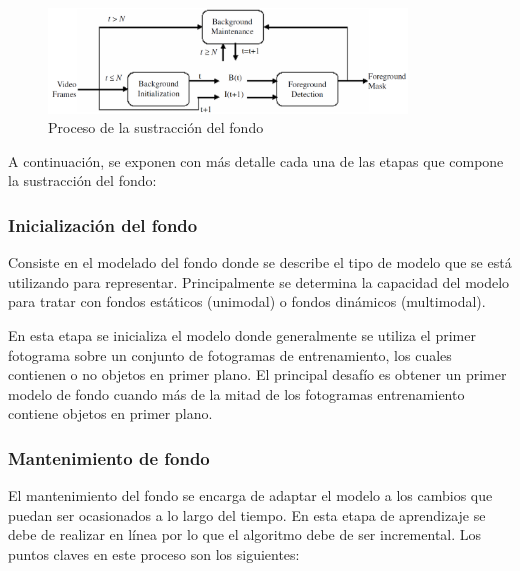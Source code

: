 \begin{figure}[ht]
\centering
\includegraphics[width=0.85\textwidth]{img/chapters/estado-del-arte/background-subtraction-process.png}
\caption{\label{fig:background-subtraction-process}Proceso de la sustracción del fondo \cite{BOUWMANS201431}}
\end{figure}

A continuación, se exponen con más detalle cada una de las etapas que compone la sustracción del fondo:

\subsubsection*{Inicialización del fondo}
\label{subsubsec:inicializacion-del-fondo}

Consiste en el modelado del fondo donde se describe el tipo de modelo que se está utilizando para representar. Principalmente se determina la capacidad del modelo para tratar con fondos estáticos (unimodal) o fondos dinámicos (multimodal).

En esta etapa se inicializa el modelo donde generalmente se utiliza el primer fotograma sobre un conjunto de fotogramas de entrenamiento, los cuales contienen o no objetos en primer plano. El principal desafío es obtener un primer modelo de fondo cuando más de la mitad de los fotogramas entrenamiento contiene objetos en primer plano.


\subsubsection*{Mantenimiento de fondo}
\label{subsubsec:mantenimiento-fondo}

El mantenimiento del fondo se encarga de adaptar el modelo a los cambios que puedan ser ocasionados a lo largo del tiempo. En esta etapa de aprendizaje se debe de realizar en línea por lo que el algoritmo debe de ser incremental. Los puntos claves en este proceso son los siguientes:

